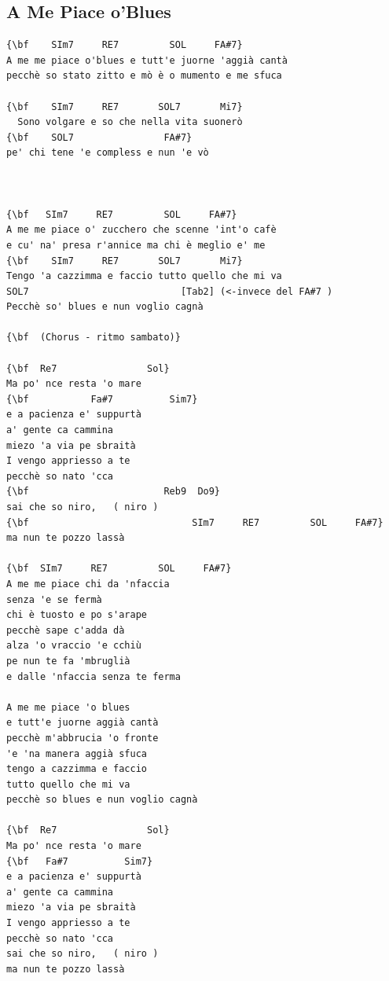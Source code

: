 \documentclass[a4paper]{article}
\begin{document}
\subsection{A Me Piace o'Blues}
\begin{Verbatim}[commandchars=\\\{\}]
{\bf    SIm7     RE7         SOL     FA#7}
A me me piace o'blues e tutt'e juorne 'aggià cantà
pecchè so stato zitto e mò è o mumento e me sfuca

{\bf    SIm7     RE7       SOL7       Mi7}
  Sono volgare e so che nella vita suonerò
{\bf    SOL7                FA#7}
pe' chi tene 'e compless e nun 'e vò



{\bf   SIm7     RE7         SOL     FA#7}
A me me piace o' zucchero che scenne 'int'o cafè
e cu' na' presa r'annice ma chi è meglio e' me
{\bf    SIm7     RE7       SOL7       Mi7}
Tengo 'a cazzimma e faccio tutto quello che mi va
SOL7                           [Tab2] (<-invece del FA#7 )
Pecchè so' blues e nun voglio cagnà

{\bf  (Chorus - ritmo sambato)}

{\bf  Re7                Sol}
Ma po' nce resta 'o mare
{\bf           Fa#7          Sim7}
e a pacienza e' suppurtà
a' gente ca cammina
miezo 'a via pe sbraità
I vengo appriesso a te
pecchè so nato 'cca
{\bf                        Reb9  Do9}
sai che so niro,   ( niro )
{\bf                             SIm7     RE7         SOL     FA#7}
ma nun te pozzo lassà

{\bf  SIm7     RE7         SOL     FA#7}
A me me piace chi da 'nfaccia
senza 'e se fermà
chi è tuosto e po s'arape
pecchè sape c'adda dà
alza 'o vraccio 'e cchiù
pe nun te fa 'mbruglià
e dalle 'nfaccia senza te ferma

A me me piace 'o blues
e tutt'e juorne aggià cantà
pecchè m'abbrucia 'o fronte
'e 'na manera aggià sfuca
tengo a cazzimma e faccio
tutto quello che mi va
pecchè so blues e nun voglio cagnà

{\bf  Re7                Sol}
Ma po' nce resta 'o mare
{\bf   Fa#7          Sim7}
e a pacienza e' suppurtà
a' gente ca cammina
miezo 'a via pe sbraità
I vengo appriesso a te
pecchè so nato 'cca
sai che so niro,   ( niro )
ma nun te pozzo lassà

\end{Verbatim}
\newpage
\end{document}
